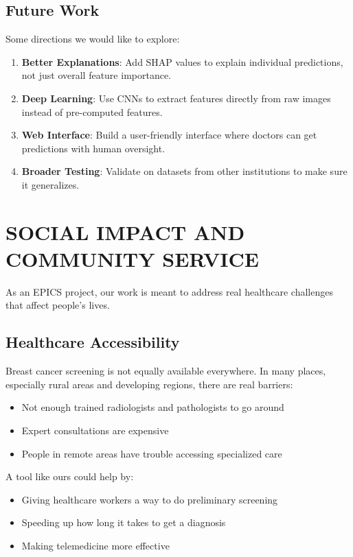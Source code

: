 \documentclass[12pt]{article}
\begin{document}
\subsection{Future Work}

Some directions we would like to explore:
\begin{enumerate}
    \item \textbf{Better Explanations}: Add SHAP values to explain individual predictions, not just overall feature importance.
    \item \textbf{Deep Learning}: Use CNNs to extract features directly from raw images instead of pre-computed features.
    \item \textbf{Web Interface}: Build a user-friendly interface where doctors can get predictions with human oversight.
    \item \textbf{Broader Testing}: Validate on datasets from other institutions to make sure it generalizes.
\end{enumerate}

\newpage
\section{SOCIAL IMPACT AND COMMUNITY SERVICE}

As an EPICS project, our work is meant to address real healthcare challenges that affect people's lives.

\subsection{Healthcare Accessibility}

Breast cancer screening is not equally available everywhere. In many places, especially rural areas and developing regions, there are real barriers:
\begin{itemize}
    \item Not enough trained radiologists and pathologists to go around
    \item Expert consultations are expensive
    \item People in remote areas have trouble accessing specialized care
\end{itemize}

A tool like ours could help by:
\begin{itemize}
    \item Giving healthcare workers a way to do preliminary screening
    \item Speeding up how long it takes to get a diagnosis
    \item Making telemedicine more effective
\end{itemize}
\end{document}
